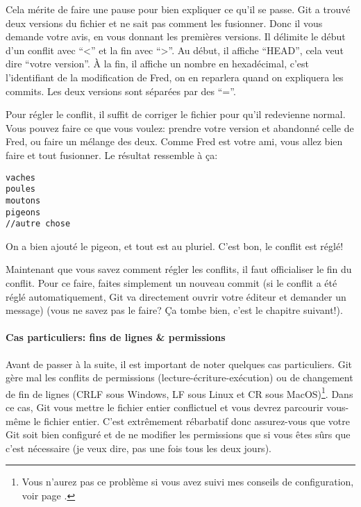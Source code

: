 \documentclass[10pt,a4paper]{article}
\begin{document}
\begin{itemize}
Cela mérite de faire une pause pour bien expliquer ce qu'il se passe. Git a trouvé deux versions du fichier et ne sait pas comment les fusionner. Donc il vous demande votre avis, en vous donnant les premières versions. Il délimite le début d'un conflit avec ``<'' et la fin avec ``>''. Au début, il affiche ``HEAD'', cela veut dire ``votre version''. À la fin, il affiche un nombre en hexadécimal, c'est l'identifiant de la modification de Fred, on en reparlera quand on expliquera les commits. Les deux versions sont séparées par des ``=''.

Pour régler le conflit, il suffit de corriger le fichier pour qu'il redevienne normal. Vous pouvez faire ce que vous voulez: prendre votre version et abandonné celle de Fred, ou faire un mélange des deux. Comme Fred est votre ami, vous allez bien faire et tout fusionner. Le résultat ressemble à ça:

\begin{verbatim}
vaches
poules
moutons
pigeons
//autre chose
\end{verbatim}

On a bien ajouté le pigeon, et tout est au pluriel. C'est bon, le conflit est réglé!
\end{itemize}

Maintenant que vous savez comment régler les conflits, il faut officialiser le fin du conflit. Pour ce faire, faites simplement un nouveau commit (si le conflit a été réglé automatiquement, Git va directement ouvrir votre éditeur et demander un message) (vous ne savez pas le faire? Ça tombe bien, c'est le chapitre suivant!).

\paragraph{Cas particuliers: fins de lignes \& permissions}
Avant de passer à la suite, il est important de noter quelques cas particuliers. Git gère mal les conflits de permissions (lecture-écriture-exécution) ou de changement de fin de lignes (CRLF sous Windows, LF sous Linux et CR sous MacOS)\footnote{Vous n'aurez pas ce problème si vous avez suivi mes conseils de configuration, voir page \pageref{config}.}. Dans ce cas, Git vous mettre le fichier entier conflictuel et vous devrez parcourir vous-même le fichier entier. C'est extrêmement rébarbatif donc assurez-vous que votre Git soit bien configuré et de ne modifier les permissions que si vous êtes sûrs que c'est nécessaire (je veux dire, pas une fois tous les deux jours).
\end{document}
